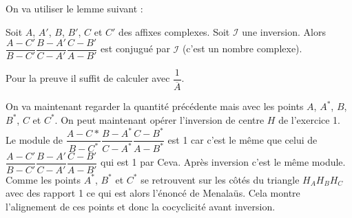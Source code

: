 \begin{sol}

On va utiliser le lemme suivant : 

\begin{lem}

Soit $A$, $A'$, $B$, $B'$, $C$ et $C'$ des affixes complexes. Soit $\mathcal{I}$ une inversion. Alors $\dfrac{A-C'}{B-C'}\dfrac{B-A'}{C-A'}\dfrac{C-B'}{A-B'}$ est conjugué par $\mathcal{I}$ (c'est un nombre complexe).
\end{lem}

\begin{preuve}
Pour la preuve il suffit de calculer avec $\dfrac{1}{\overline{A}}$.
\end{preuve}

On va maintenant regarder la quantité précédente mais avec les points $A$, $A^*$, $B$, $B^*$, $C$ et $C^*$. On peut maintenant opérer l'inversion de centre $H$ de l'exercice 1. Le module de $\dfrac{A-C*}{B-C^*}\dfrac{B-A^*}{C-A^*}\dfrac{C-B^*}{A-B^*}$ est 1 car c'est le même que celui de $\dfrac{A-C'}{B-C'}\dfrac{B-A'}{C-A'}\dfrac{C-B'}{A-B'}$ qui est 1 par Ceva. Après inversion c'est le même module. Comme les points $A^*$, $B^*$ et $C^*$ se retrouvent sur les côtés du triangle $H_AH_BH_C$ avec des rapport 1 ce qui est alors l'énoncé de Menalaüs. Cela montre l'alignement de ces points et donc la cocyclicité avant inversion.


\end{sol}


